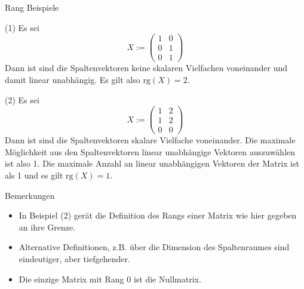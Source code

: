 \documentclass[
  8pt,
  ignorenonframetext,
]{beamer}
\providecommand{\tightlist}{%
  \setlength{\itemsep}{0pt}\setlength{\parskip}{0pt}}
\begin{document}
\begin{frame}{Rang}
\protect\hypertarget{rang-5}{}
Beispiele

\footnotesize

\noindent (1) Es sei \begin{equation}
X := \begin{pmatrix} 1 & 0  \\ 0 & 1  \\ 0 &  1  \end{pmatrix}
\end{equation} Dann ist sind die Spaltenvektoren keine skalaren
Vielfachen voneinander und damit linear unabhängig. Es gilt also
\(\mbox{rg}(X) = 2\).

\noindent (2) Es sei \begin{equation}
X := \begin{pmatrix} 1 & 2  \\ 1 & 2  \\ 0 &  0  \end{pmatrix}
\end{equation} Dann ist sind die Spaltenvektoren skalare Vielfache
voneinander. Die maximale Möglichkeit aus den Spaltenvektoren linear
unabhängige Vektoren auszuwählen ist also 1. Die maximale Anzahl an
linear unabhängigen Vektoren der Matrix ist als 1 und es gilt
\(\mbox{rg}(X) = 1\).

Bemerkungen

\begin{itemize}
\tightlist
\item
  In Beispiel (2) gerät die Definition des Rangs einer Matrix wie hier
  gegeben an ihre Grenze.
\item
  Alternative Definitionen, z.B. über die Dimension des Spaltenraumes
  sind eindeutiger, aber tiefgehender.
\item
  Die einzige Matrix mit Rang 0 ist die Nullmatrix.
\end{itemize}
\end{frame}
\end{document}
